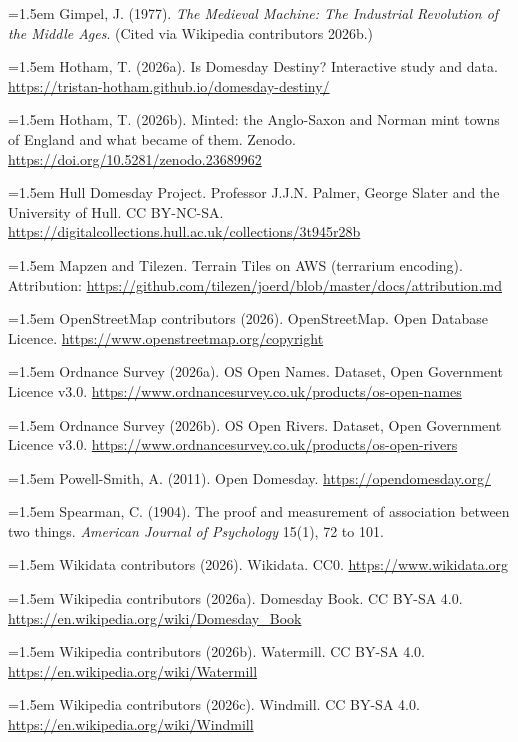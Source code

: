 \documentclass[11pt,a4paper]{article}
\begin{document}
\hangindent=1.5em Gimpel, J. (1977). \textit{The Medieval Machine: The Industrial Revolution of the Middle Ages}. (Cited via Wikipedia contributors 2026b.)

\hangindent=1.5em Hotham, T. (2026a). Is Domesday Destiny? Interactive study and data. \url{https://tristan-hotham.github.io/domesday-destiny/}

\hangindent=1.5em Hotham, T. (2026b). Minted: the Anglo-Saxon and Norman mint towns of England and what became of them. Zenodo. \url{https://doi.org/10.5281/zenodo.23689962}

\hangindent=1.5em Hull Domesday Project. Professor J.J.N. Palmer, George Slater and the University of Hull. CC BY-NC-SA. \url{https://digitalcollections.hull.ac.uk/collections/3t945r28b}

\hangindent=1.5em Mapzen and Tilezen. Terrain Tiles on AWS (terrarium encoding). Attribution: \url{https://github.com/tilezen/joerd/blob/master/docs/attribution.md}

\hangindent=1.5em OpenStreetMap contributors (2026). OpenStreetMap. Open Database Licence. \url{https://www.openstreetmap.org/copyright}

\hangindent=1.5em Ordnance Survey (2026a). OS Open Names. Dataset, Open Government Licence v3.0. \url{https://www.ordnancesurvey.co.uk/products/os-open-names}

\hangindent=1.5em Ordnance Survey (2026b). OS Open Rivers. Dataset, Open Government Licence v3.0. \url{https://www.ordnancesurvey.co.uk/products/os-open-rivers}

\hangindent=1.5em Powell-Smith, A. (2011). Open Domesday. \url{https://opendomesday.org/}

\hangindent=1.5em Spearman, C. (1904). The proof and measurement of association between two things. \textit{American Journal of Psychology} 15(1), 72 to 101.

\hangindent=1.5em Wikidata contributors (2026). Wikidata. CC0. \url{https://www.wikidata.org}

\hangindent=1.5em Wikipedia contributors (2026a). Domesday Book. CC BY-SA 4.0. \url{https://en.wikipedia.org/wiki/Domesday_Book}

\hangindent=1.5em Wikipedia contributors (2026b). Watermill. CC BY-SA 4.0. \url{https://en.wikipedia.org/wiki/Watermill}

\hangindent=1.5em Wikipedia contributors (2026c). Windmill. CC BY-SA 4.0. \url{https://en.wikipedia.org/wiki/Windmill}
\end{document}
